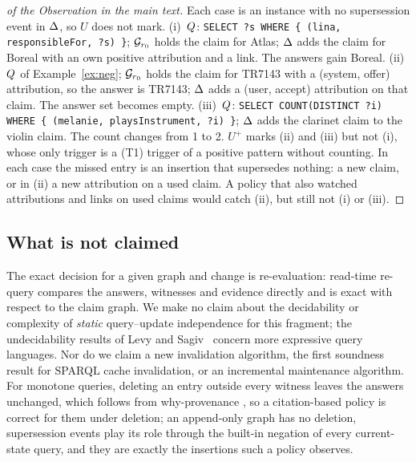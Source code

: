 \begin{proof}[of the Observation in the main text]
Each case is an instance with no supersession event in $\Delta$, so $U$ does not mark.
(i)~$Q$: \texttt{SELECT ?s WHERE \{ (lina, responsibleFor, ?s) \}}; $\mathcal G_{r_0}$ holds the claim for
Atlas; $\Delta$ adds the claim for Boreal with an own positive attribution and a link. The answers
gain Boreal.
(ii)~$Q$ of Example~\ref{ex:neg}; $\mathcal G_{r_0}$ holds the claim for TR7143 with a (system, offer)
attribution, so the answer is TR7143; $\Delta$ adds a (user, accept) attribution on that claim. The
answer set becomes empty.
(iii)~$Q$: \texttt{SELECT COUNT(DISTINCT ?i) WHERE \{ (melanie, playsInstrument, ?i) \}};
$\Delta$ adds the clarinet claim to the violin claim. The count changes from 1 to 2.
$U^+$ marks (ii) and (iii) but not (i), whose only trigger is a (T1) trigger of a positive pattern
without counting. In each case the missed entry is an insertion that supersedes nothing: a new
claim, or in (ii) a new attribution on a used claim. A policy that also watched attributions and
links on used claims would catch (ii), but still not (i) or (iii).
\end{proof}

\subsection{What is not claimed}

The exact decision for a given graph and change is re-evaluation: read-time re-query compares the
answers, witnesses and evidence directly and is exact with respect to the claim graph. We make no
claim about the decidability or complexity of \emph{static} query--update independence for this
fragment; the undecidability results of Levy and Sagiv~\cite{levy1993independent} concern more
expressive query languages. Nor do we claim a new invalidation algorithm, the first soundness
result for SPARQL cache invalidation, or an incremental maintenance algorithm. For monotone queries, deleting an
entry outside every witness leaves the answers unchanged, which follows from why-provenance
\cite{buneman2001why}, so a citation-based policy is correct for them under deletion; an append-only graph has no deletion, supersession events
play its role through the built-in negation of every current-state query, and they are exactly
the insertions such a policy observes.
